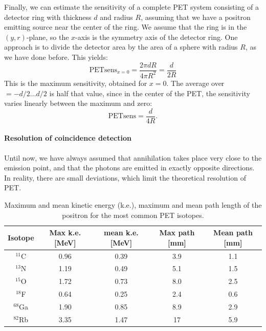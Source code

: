 \documentclass[11pt,oneside]{article}
\begin{document}
Finally, we can estimate the sensitivity of a complete PET system consisting
of a detector ring with thickness $d$ and radius $R$, assuming that we have a
positron emitting source near the center of the ring. We assume that the ring
is in the $(y,r)$-plane, so the $x$-axis is the symmetry axis of the detector
ring.  One approach is to divide the detector area by the area of a sphere
with radius $R$, as we have done before. This yields:
\begin{equation}
  \mbox{PETsens}_{x=0} = \frac{2 \pi d R}{ 4 \pi R^2} = \frac{d}{2R}
\end{equation}
This is the maximum sensitivity, obtained for $x = 0$. The average over $ =
-d/2 \ldots d/2$ is half that value, since in the center of the PET, the
sensitivity varies linearly between the maximum and zero:
\begin{equation}
  \mbox{PETsens} = \frac{d}{4R}. \label{eq:petsens}
\end{equation}

\paragraph{Resolution of coincidence detection}
Until now, we have always assumed that annihilation takes place very close to
the emission point, and that the photons are emitted in exactly opposite
directions. In reality, there are small deviations, which limit the
theoretical resolution of PET. 

\begin{table}
\caption{Maximum and mean kinetic energy (k.e.), maximum and mean path length
of the positron for the most common PET isotopes.}
\label{tab:positron_length}
\begin{center}
\begin{tabular}{|c|c|c|c|c|}
\hline
Isotope   & Max k.e. [MeV] & mean k.e. [MeV] & Max path [mm] & Mean path [mm]\\
\hline
$^{11}$C  & 0.96 & 0.39 & 3.9    & 1.1 \\
$^{13}$N  & 1.19 & 0.49 & 5.1    & 1.5 \\
$^{15}$O  & 1.72 & 0.73 & 8.0    & 2.5 \\
$^{18}$F  & 0.64 & 0.25 & 2.4    & 0.6 \\
$^{68}$Ga & 1.90 & 0.85 & 8.9    & 2.9 \\
$^{82}$Rb & 3.35 & 1.47 & 17     & 5.9 \\
\hline
\end{tabular}
\end{center}
\end{table}
\end{document}
